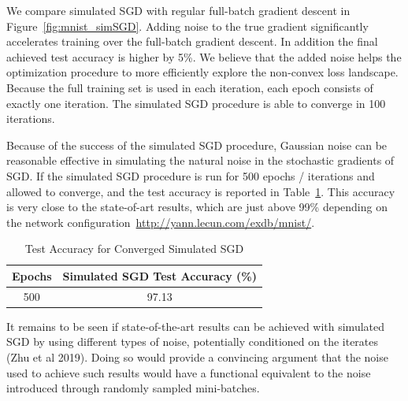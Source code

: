 \documentclass{article} %
\begin{document}
We compare simulated SGD with regular full-batch gradient descent in Figure~\ref{fig:mnist_simSGD}. 
Adding noise to the true gradient significantly accelerates training over the full-batch gradient descent.
In addition the final achieved test accuracy is higher by 5\%.
We believe that the added noise helps the optimization procedure to more efficiently explore the non-convex loss landscape.
Because the full training set is used in each iteration, each epoch consists of exactly one iteration.
The simulated SGD procedure is able to converge in 100 iterations.

Because of the success of the simulated SGD procedure, Gaussian noise can be reasonable effective in simulating the natural noise in the stochastic gradients of SGD.
If the simulated SGD procedure is run for 500 epochs / iterations and allowed to converge, and the test accuracy is reported in Table~\ref{tab:mnist_simSGD}.
This accuracy is very close to the state-of-art results, which are just above 99\% depending on the network configuration~\url{http://yann.lecun.com/exdb/mnist/}.

\begin{table}[h]
\begin{center}
\begin{tabular}{ c c}
 Epochs & Simulated SGD Test Accuracy (\%) \\ 
 \hline
 500 & 97.13 \\
\end{tabular}
\end{center}
\caption{Test Accuracy for Converged Simulated SGD}
\label{tab:mnist_simSGD}
\end{table}

It remains to be seen if state-of-the-art results can be achieved with simulated SGD by using different types of noise, potentially conditioned on the iterates (Zhu et al 2019).
Doing so would provide a convincing argument that the noise used to achieve such results would have a functional equivalent to the noise introduced through randomly sampled mini-batches.
\end{document}
